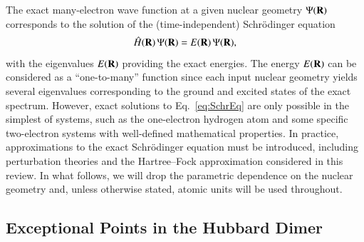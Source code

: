 \documentclass[aps,prb,reprint,noshowkeys,superscriptaddress]{revtex4-1}
\newcommand{\hH}{\Hat{H}}
\begin{document}
The exact many-electron wave function at a given nuclear geometry $\Psi(\vb{R})$ corresponds 
to the solution of the (time-independent) Schr\"{o}dinger equation
\begin{equation} 
    \hH(\vb{R})\, \Psi(\vb{R}) = E(\vb{R})\, \Psi(\vb{R}),
    \label{eq:SchrEq}
\end{equation} 
with the eigenvalues $E(\vb{R})$ providing the exact energies.
The energy $E(\vb{R})$ can be considered as a ``one-to-many'' function since each input nuclear geometry
yields several eigenvalues corresponding to the ground and excited states of the exact spectrum.
However, exact solutions to Eq.~\eqref{eq:SchrEq} are only possible in the simplest of systems, such as 
the one-electron hydrogen atom and some specific two-electron systems with well-defined mathematical 
properties.\cite{Taut_1993,Loos_2009b,Loos_2010e,Loos_2012}
In practice, approximations to the exact Schr\"{o}dinger equation must be introduced, including
perturbation theories and the Hartree--Fock approximation considered in this review.
In what follows, we will drop the parametric dependence on the nuclear geometry and, 
unless otherwise stated, atomic units will be used throughout.

\subsection{Exceptional Points in the Hubbard Dimer}
\label{sec:example}
\end{document}
